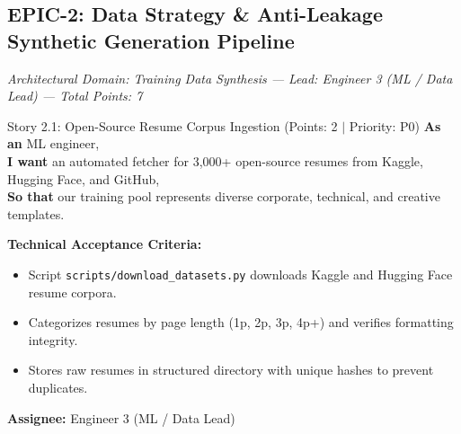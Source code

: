 \documentclass[11pt,a4paper]{article}
\begin{document}
\clearpage

\subsection{EPIC-2: Data Strategy \& Anti-Leakage Synthetic Generation Pipeline}
\textit{Architectural Domain: Training Data Synthesis --- Lead: Engineer 3 (ML / Data Lead) --- Total Points: 7}

\vspace{0.5em}

\begin{storybox}{Story 2.1: Open-Source Resume Corpus Ingestion (Points: 2 $|$ Priority: P0)}
\textbf{As an} ML engineer, \\
\textbf{I want} an automated fetcher for 3,000+ open-source resumes from Kaggle, Hugging Face, and GitHub, \\
\textbf{So that} our training pool represents diverse corporate, technical, and creative templates.

\vspace{0.3em}
\textbf{Technical Acceptance Criteria:}
\begin{itemize}[leftmargin=1.2em, itemsep=1pt]
    \item Script \texttt{scripts/download\_datasets.py} downloads Kaggle and Hugging Face resume corpora.
    \item Categorizes resumes by page length (1p, 2p, 3p, 4p+) and verifies formatting integrity.
    \item Stores raw resumes in structured directory with unique hashes to prevent duplicates.
\end{itemize}
\textbf{Assignee:} Engineer 3 (ML / Data Lead)
\end{storybox}
\end{document}
